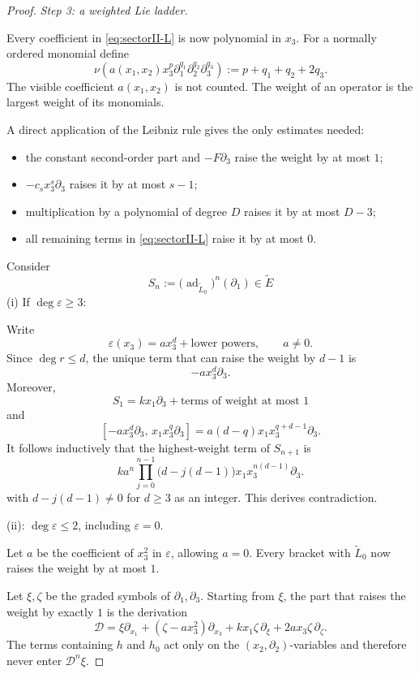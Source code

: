 \documentclass[11pt,a4paper]{article}
\numberwithin{equation}{section}
\theoremstyle{journalplain}
\theoremstyle{journaldef}
\newcommand{\eps}{\varepsilon}
\begin{document}
\begin{proof}
\medskip
\noindent\emph{Step 3: a weighted Lie ladder.}

Every coefficient in \eqref{eq:sectorII-L} is now polynomial in \(x_3\).
For a normally ordered monomial define
\[
\nu\!\left(
a(x_1,x_2)x_3^p
\partial_1^{q_1}\partial_2^{q_2}\partial_3^{q_3}
\right)
:=p+q_1+q_2+2q_3.
\]
The visible coefficient \(a(x_1,x_2)\) is not counted. The weight of an
operator is the largest weight of its monomials.

A direct application of the Leibniz rule gives the only estimates needed:

\begin{itemize}
\item the constant second-order part and \(-F\partial_3\) raise the
weight by at most \(1\);
\item \(-c_sx_3^s\partial_3\) raises it by at most \(s-1\);
\item multiplication by a polynomial of degree \(D\) raises it by at
most \(D-3\);
\item all remaining terms in \eqref{eq:sectorII-L} raise it by at most
\(0\).
\end{itemize}

Consider
\[
S_n
:=\bigl(\operatorname{ad}_{\widetilde L_0}\bigr)^n(\partial_1) \in \widetilde E\]
(i) If $\deg \eps \ge 3$:

Write
\[
\varepsilon(x_3)
=ax_3^d+\text{lower powers},
\qquad a\ne0.
\]
Since \(\deg r\le d\), the unique term that can raise the weight by
\(d-1\) is
\[
-ax_3^d\partial_3.
\]
Moreover,
\[
S_1
=kx_1\partial_3+\text{terms of weight at most \(1\)}
\]
and
\[
[-ax_3^d\partial_3,\,
  x_1x_3^q\partial_3]
=
a(d-q)x_1x_3^{q+d-1}\partial_3.
\]
It follows inductively that the highest-weight term of \(S_{n+1}\) is
\[
ka^n
\prod_{j=0}^{n-1}\bigl(d-j(d-1)\bigr)
x_1x_3^{n(d-1)}\partial_3.
\]
with $d - j(d-1) \neq 0$ for $d \ge 3$ as an integer. This derives contradiction.

(ii): \(\deg\varepsilon\le2\), including
\(\varepsilon=0\).

Let \(a\) be the coefficient of \(x_3^2\) in \(\varepsilon\), allowing
\(a=0\). Every bracket with \(\widetilde L_0\) now raises the weight by
at most \(1\).

Let \(\xi,\zeta\) be the graded symbols of
\(\partial_1,\partial_3\). Starting from \(\xi\), the part that raises
the weight by exactly \(1\) is the derivation
\[
\mathcal D
=
\xi\partial_{x_1}
+(\zeta-ax_3^2)\partial_{x_3}
+kx_1\zeta\,\partial_\xi
+2ax_3\zeta\,\partial_\zeta.
\]
The terms containing \(h\) and \(h_0\) act only on the
\((x_2,\partial_2)\)-variables and therefore never enter
\(\mathcal D^n\xi\).


\end{proof}
\end{document}

